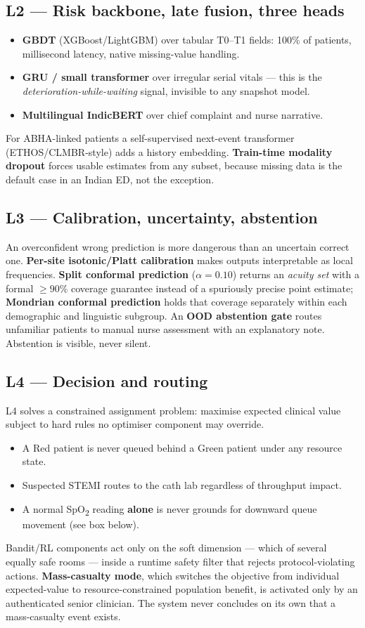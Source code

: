 \documentclass[10pt,a4paper,twocolumn]{article}
\begin{document}
\subsection{L2 --- Risk backbone, late fusion, three heads}
\begin{itemize}
  \item \textbf{GBDT} (XGBoost/LightGBM) over tabular T0--T1 fields: 100\% of
        patients, millisecond latency, native missing-value handling.
  \item \textbf{GRU / small transformer} over irregular serial vitals --- this is the
        \emph{deterioration-while-waiting} signal, invisible to any snapshot model.
  \item \textbf{Multilingual IndicBERT} over chief complaint and nurse narrative.
\end{itemize}
For ABHA-linked patients a self-supervised next-event transformer (ETHOS/CLMBR-style)
adds a history embedding. \textbf{Train-time modality dropout} forces usable estimates
from any subset, because missing data is the default case in an Indian ED, not the
exception.

\subsection{L3 --- Calibration, uncertainty, abstention}
An overconfident wrong prediction is more dangerous than an uncertain correct one.
\textbf{Per-site isotonic/Platt calibration} makes outputs interpretable as local
frequencies. \textbf{Split conformal prediction} ($\alpha=0.10$) returns an
\emph{acuity set} with a formal $\ge 90\%$ coverage guarantee instead of a spuriously
precise point estimate; \textbf{Mondrian conformal prediction} holds that coverage
separately within each demographic and linguistic subgroup. An \textbf{OOD abstention
gate} routes unfamiliar patients to manual nurse assessment with an explanatory note.
Abstention is visible, never silent.

\subsection{L4 --- Decision and routing}
L4 solves a constrained assignment problem: maximise expected clinical value subject
to hard rules no optimiser component may override.
\begin{itemize}
  \item A Red patient is never queued behind a Green patient under any resource state.
  \item Suspected STEMI routes to the cath lab regardless of throughput impact.
  \item A normal SpO\textsubscript{2} reading \textbf{alone} is never grounds for
        downward queue movement (see box below).
\end{itemize}
Bandit/RL components act only on the soft dimension --- which of several equally safe
rooms --- inside a runtime safety filter that rejects protocol-violating actions.
\textbf{Mass-casualty mode}, which switches the objective from individual
expected-value to resource-constrained population benefit, is activated only by an
authenticated senior clinician. The system never concludes on its own that a
mass-casualty event exists.
\end{document}
